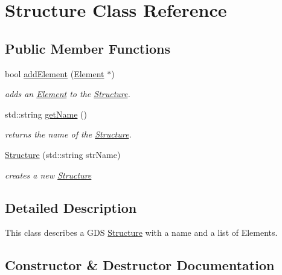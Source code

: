 \hypertarget{class_a_g_d_s_1_1_structure}{}\section{Structure Class Reference}
\label{class_a_g_d_s_1_1_structure}
\subsection*{Public Member Functions}
\begin{DoxyCompactItemize}
\item 
bool \mbox{\hyperlink{class_a_g_d_s_1_1_structure_a2dd203e6770f7d15d6f706867c919a60}{add\+Element}} (\mbox{\hyperlink{class_a_g_d_s_1_1_element}{Element}} $\ast$)
\begin{DoxyCompactList}\small\item\em adds an \mbox{\hyperlink{class_a_g_d_s_1_1_element}{Element}} to the \mbox{\hyperlink{class_a_g_d_s_1_1_structure}{Structure}}. \end{DoxyCompactList}\item 
\mbox{\label{class_a_g_d_s_1_1_structure_ac0fc966d4386ddb71d99361e3fccb311}} 
std\+::string \mbox{\hyperlink{class_a_g_d_s_1_1_structure_ac0fc966d4386ddb71d99361e3fccb311}{get\+Name}} ()
\begin{DoxyCompactList}\small\item\em returns the name of the \mbox{\hyperlink{class_a_g_d_s_1_1_structure}{Structure}}. \end{DoxyCompactList}\item 
\mbox{\hyperlink{class_a_g_d_s_1_1_structure_a797bfd2e6684bb9870c8070b4ef6ff41}{Structure}} (std\+::string str\+Name)
\begin{DoxyCompactList}\small\item\em creates a new \mbox{\hyperlink{class_a_g_d_s_1_1_structure}{Structure}} \end{DoxyCompactList}\end{DoxyCompactItemize}


\subsection{Detailed Description}
This class describes a G\+DS \mbox{\hyperlink{class_a_g_d_s_1_1_structure}{Structure}} with a name and a list of Elements. 

\subsection{Constructor \& Destructor Documentation}
\mbox{\label{class_a_g_d_s_1_1_structure_a797bfd2e6684bb9870c8070b4ef6ff41}} 
